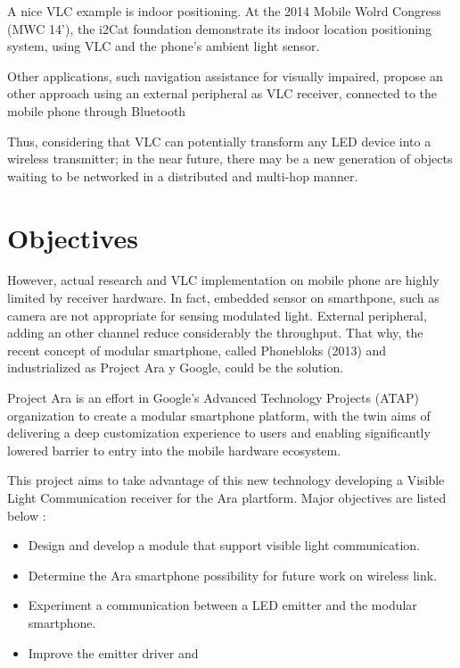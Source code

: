 A nice VLC example is indoor positioning. At the 2014 Mobile Wolrd Congress (MWC 14'), the i2Cat foundation demonstrate its indoor location positioning system, using VLC and the phone's ambient light sensor.

Other applications, such navigation assistance for visually impaired, propose an other approach using an external peripheral as VLC receiver, connected to the mobile phone through Bluetooth \citep{bluereceiver}

Thus, considering that VLC can potentially transform any LED device into a wireless transmitter; in the near future, there may be a new generation of objects waiting to be networked in a distributed and multi-hop manner.



\section{Objectives}
However, actual research and VLC implementation on mobile phone are highly limited by receiver hardware. In fact, embedded sensor on smarthpone, such as camera are not appropriate for sensing modulated light. External peripheral, adding an other channel reduce considerably the throughput.
That why, the recent concept of modular smartphone, called Phonebloks (2013) and industrialized as Project Ara y Google, could be the solution.

Project Ara is an effort in Google's Advanced Technology Projects (ATAP) organization to create a modular smartphone platform, with the twin aims of delivering a deep customization experience to users and enabling significantly lowered barrier to entry into the mobile hardware ecosystem.

This project aims to take advantage of this new technology developing a Visible Light Communication receiver for the Ara plartform. Major objectives are listed below :
\begin{itemize}
\item Design and develop a module that support visible light communication.
\item Determine the Ara smartphone possibility for future work on wireless link.
\item Experiment a communication between a LED emitter and the modular smartphone.
\item Improve the emitter driver and 
\end{itemize}


